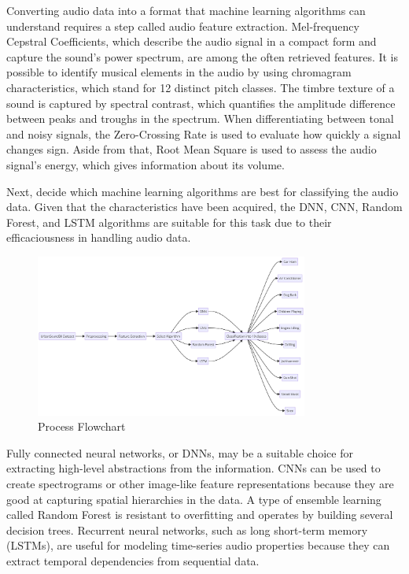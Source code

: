 \documentclass[conference]{IEEEtran}
\begin{document}
Converting audio data into a format that machine learning algorithms can understand requires a step called audio feature extraction. Mel-frequency Cepstral Coefficients, which describe the audio signal in a compact form and capture the sound's power spectrum, are among the often retrieved features. \cite{spectogramissuesarticle} It is possible to identify musical elements in the audio by using chromagram characteristics, which stand for 12 distinct pitch classes. The timbre texture of a sound is captured by spectral contrast, which quantifies the amplitude difference between peaks and troughs in the spectrum. When differentiating between tonal and noisy signals, the Zero-Crossing Rate is used to evaluate how quickly a signal changes sign. Aside from that, Root Mean Square is used to assess the audio signal's energy, which gives information about its volume.

Next, decide which machine learning algorithms are best for classifying the audio data. Given that the characteristics have been acquired, the DNN, CNN, Random Forest, and LSTM algorithms are suitable for this task due to their efficaciousness in handling audio data. 


\begin{figure}[htbp]
\centerline{\includegraphics[width=0.8\textwidth]{Images/diagram.png}}
\caption{Process Flowchart}
\label{fig:farmer}
\end{figure}

Fully connected neural networks, or DNNs, may be a suitable choice for extracting high-level abstractions from the information. CNNs can be used to create spectrograms or other image-like feature representations because they are good at capturing spatial hierarchies in the data.\cite{algan2021image} A type of ensemble learning called Random Forest is resistant to overfitting and operates by building several decision trees. Recurrent neural networks, such as long short-term memory (LSTMs), are useful for modeling time-series audio properties because they can extract temporal dependencies from sequential data. \cite{rawarticle}
\end{document}
